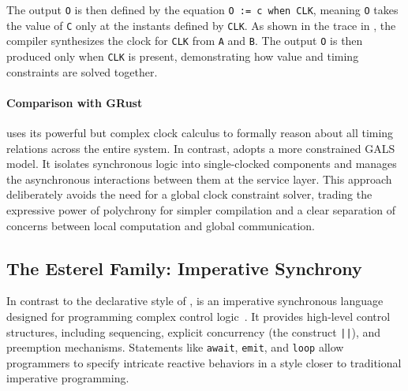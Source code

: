 The output \texttt{O} is then defined by the equation \texttt{O := c when CLK}, meaning \texttt{O}
takes the value of \texttt{C} only at the instants defined by \texttt{CLK}. As shown in the trace in
, the compiler synthesizes the clock for \texttt{CLK} from
\texttt{A} and \texttt{B}. The output \texttt{O} is then produced only when \texttt{CLK} is present,
demonstrating how value and timing constraints are solved together.

\paragraph*{Comparison with GRust}

\Signal uses its powerful but complex clock calculus to formally reason about all timing relations
across the entire system. In contrast, \GRust adopts a more constrained GALS model. It isolates
synchronous logic into single-clocked \GRSync components and manages the asynchronous interactions
between them at the \GRFRP service layer. This approach deliberately avoids the need for a global
clock constraint solver, trading the expressive power of polychrony for simpler compilation and a
clear separation of concerns between local computation and global communication.

\subsection{The Esterel Family: Imperative Synchrony}
\label{sec:sota:synchronous:esterel}

In contrast to the declarative style of \Lustre, \Esterel is an imperative synchronous language
designed for programming complex control logic~\cite{DBLP:journals/scp/BerryG92}. It provides
high-level control structures, including sequencing, explicit concurrency (\via the construct
\texttt{||}), and preemption mechanisms. Statements like \texttt{await}, \texttt{emit}, and
\texttt{loop} allow programmers to specify intricate reactive behaviors in a style closer to
traditional imperative programming.

